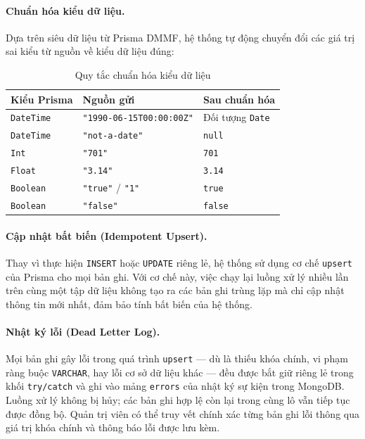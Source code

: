 \paragraph{Chuẩn hóa kiểu dữ liệu.}
Dựa trên siêu dữ liệu từ Prisma DMMF, hệ thống tự động chuyển đổi các giá trị sai kiểu từ nguồn về kiểu dữ liệu đúng:

\begin{table}[H]
\centering
\caption{Quy tắc chuẩn hóa kiểu dữ liệu}
\begin{tabular}{lll}
\hline
\textbf{Kiểu Prisma} & \textbf{Nguồn gửi} & \textbf{Sau chuẩn hóa} \\
\hline
\texttt{DateTime} & \texttt{"1990-06-15T00:00:00Z"} & Đối tượng \texttt{Date} \\
\texttt{DateTime} & \texttt{"not-a-date"}           & \texttt{null} \\
\texttt{Int}      & \texttt{"701"}                  & \texttt{701} \\
\texttt{Float}    & \texttt{"3.14"}                 & \texttt{3.14} \\
\texttt{Boolean}  & \texttt{"true"} / \texttt{"1"}  & \texttt{true} \\
\texttt{Boolean}  & \texttt{"false"}                & \texttt{false} \\
\hline
\end{tabular}
\end{table}

\paragraph{Cập nhật bất biến (Idempotent Upsert).}
Thay vì thực hiện \texttt{INSERT} hoặc \texttt{UPDATE} riêng lẻ, hệ thống sử dụng cơ chế \texttt{upsert} của Prisma cho mọi bản ghi. Với cơ chế này, việc chạy lại luồng xử lý nhiều lần trên cùng một tập dữ liệu không tạo ra các bản ghi trùng lặp mà chỉ cập nhật thông tin mới nhất, đảm bảo tính bất biến của hệ thống.

\paragraph{Nhật ký lỗi (Dead Letter Log).}
Mọi bản ghi gây lỗi trong quá trình \texttt{upsert} --- dù là thiếu khóa chính, vi phạm ràng buộc \texttt{VARCHAR}, hay lỗi cơ sở dữ liệu khác --- đều được bắt giữ riêng lẻ trong khối \texttt{try/catch} và ghi vào mảng \texttt{errors} của nhật ký sự kiện trong MongoDB. Luồng xử lý không bị hủy; các bản ghi hợp lệ còn lại trong cùng lô vẫn tiếp tục được đồng bộ. Quản trị viên có thể truy vết chính xác từng bản ghi lỗi thông qua giá trị khóa chính và thông báo lỗi được lưu kèm.

